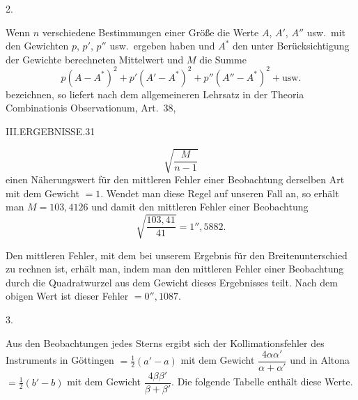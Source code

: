 \begin{center}2.\end{center}

Wenn $n$ verschiedene Bestimmungen einer Größe die Werte $A$, $A'$, $A''$
usw.\ mit den Gewichten $p$, $p'$, $p''$ usw.\ ergeben haben und $A^\ast$ den unter
Berücksichtigung der Gewichte berechneten Mittelwert und $M$ die Summe
\[
p(A-A^\ast)^2+p'(A'-A^\ast)^2+p''(A''-A^\ast)^2+\text{usw.}
\]
bezeichnen, so liefert nach dem allgemeineren Lehrsatz in der Theoria Combinationis
Observationum, Art.\ 38,

\clearpage
\noindent\mbox{}\hfill III.\quad ERGEBNISSE.\hfill 31\par
\[
\sqrt{\frac{M}{n-1}}
\]
einen Näherungswert für den mittleren Fehler einer Beobachtung derselben
Art mit dem Gewicht $=1$. Wendet man diese Regel auf
unseren Fall an, so erhält man $M=103{,}4126$ und damit den mittleren Fehler einer Beobachtung
\[
\sqrt{\frac{103{,}41}{41}}=1''{,}5882.
\]

Den mittleren Fehler, mit dem bei unserem Ergebnis für den Breitenunterschied
zu rechnen ist, erhält man, indem man den mittleren Fehler einer Beobachtung
durch die Quadratwurzel aus dem Gewicht dieses Ergebnisses teilt. Nach dem obigen
Wert ist dieser Fehler $=0''{,}1087$.

\begin{center}3.\end{center}

Aus den Beobachtungen jedes Sterns ergibt sich der Kollimationsfehler des Instruments
in Göttingen $=\frac12(a'-a)$ mit dem Gewicht $\dfrac{4\alpha\alpha'}{\alpha+\alpha'}$ und in
Altona $=\frac12(b'-b)$ mit dem Gewicht $\dfrac{4\beta\beta'}{\beta+\beta'}$. Die folgende Tabelle enthält diese
Werte.

